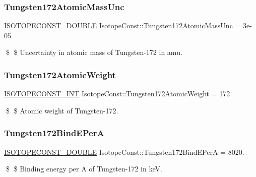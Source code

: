 \subsubsection{\texorpdfstring{Tungsten172\+Atomic\+Mass\+Unc}{Tungsten172AtomicMassUnc}}
{\footnotesize\ttfamily \mbox{\hyperlink{group___isotope_const-_macros_ga8f45a7272ce02c0b4c65c44636ed719a}{I\+S\+O\+T\+O\+P\+E\+C\+O\+N\+S\+T\+\_\+\+D\+O\+U\+B\+LE}} Isotope\+Const\+::\+Tungsten172\+Atomic\+Mass\+Unc = 3e-\/05}

\$ \$ Uncertainty in atomic mass of Tungsten-\/172 in amu. \mbox{\label{group___isotope_const-_tungsten-_w172_ga61d45fa88e07b06a6eb5e36dc826a2e7}} 
\subsubsection{\texorpdfstring{Tungsten172\+Atomic\+Weight}{Tungsten172AtomicWeight}}
{\footnotesize\ttfamily \mbox{\hyperlink{group___isotope_const-_macros_ga5f18360b3e99483a35c32d789e62621c}{I\+S\+O\+T\+O\+P\+E\+C\+O\+N\+S\+T\+\_\+\+I\+NT}} Isotope\+Const\+::\+Tungsten172\+Atomic\+Weight = 172}

\$ \$ Atomic weight of Tungsten-\/172. \mbox{\label{group___isotope_const-_tungsten-_w172_ga7616bcdc44e84f10a14b38798849f3da}} 
\subsubsection{\texorpdfstring{Tungsten172\+Bind\+E\+PerA}{Tungsten172BindEPerA}}
{\footnotesize\ttfamily \mbox{\hyperlink{group___isotope_const-_macros_ga8f45a7272ce02c0b4c65c44636ed719a}{I\+S\+O\+T\+O\+P\+E\+C\+O\+N\+S\+T\+\_\+\+D\+O\+U\+B\+LE}} Isotope\+Const\+::\+Tungsten172\+Bind\+E\+PerA = 8020.}

\$ \$ Binding energy per A of Tungsten-\/172 in keV. \mbox{\label{group___isotope_const-_tungsten-_w172_gabf0946a94c62c91d816e90a45521ed46}} 
